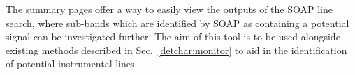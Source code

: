 The summary pages offer a way to easily view the outputs of the SOAP line search, where sub-bands which are identified by SOAP as containing a potential signal can be investigated further. 
The aim of this tool is to be used alongside existing methods described in Sec.~\ref{detchar:monitor} to aid in the identification of potential instrumental lines.


